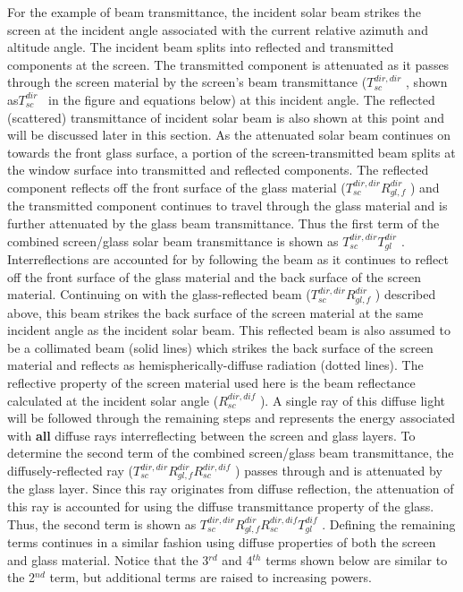 For the example of beam transmittance, the incident solar beam strikes the screen at the incident angle associated with the current relative azimuth and altitude angle. The incident beam splits into reflected and transmitted components at the screen. The transmitted component is attenuated as it passes through the screen material by the screen's beam transmittance (\(T_{sc}^{dir,dir}\) , shown as\(T_{sc}^{dir}\) ~in the figure and equations below) at this incident angle. The reflected (scattered) transmittance of incident solar beam is also shown at this point and will be discussed later in this section. As the attenuated solar beam continues on towards the front glass surface, a portion of the screen-transmitted beam splits at the window surface into transmitted and reflected components. The reflected component reflects off the front surface of the glass material (\(T_{sc}^{dir,dir}R_{gl,f}^{dir}\) ) and the transmitted component continues to travel through the glass material and is further attenuated by the glass beam transmittance. Thus the first term of the combined screen/glass solar beam transmittance is shown as \(T_{sc}^{dir,dir}T_{gl}^{dir}\) . Interreflections are accounted for by following the beam as it continues to reflect off the front surface of the glass material and the back surface of the screen material. Continuing on with the glass-reflected beam (\(T_{sc}^{dir,dir}R_{gl,f}^{dir}\) ) described above, this beam strikes the back surface of the screen material at the same incident angle as the incident solar beam. This reflected beam is also assumed to be a collimated beam (solid lines) which strikes the back surface of the screen material and reflects as hemispherically-diffuse radiation (dotted lines). The reflective property of the screen material used here is the beam reflectance calculated at the incident solar angle (\(R_{sc}^{dir,dif}\) ). A single ray of this diffuse light will be followed through the remaining steps and represents the energy associated with \textbf{all} diffuse rays interreflecting between the screen and glass layers. To determine the second term of the combined screen/glass beam transmittance, the diffusely-reflected ray (\(T_{sc}^{dir,dir}R_{gl,f}^{dir}R_{sc}^{dir,dif}\) ) passes through and is attenuated by the glass layer. Since this ray originates from diffuse reflection, the attenuation of this ray is accounted for using the diffuse transmittance property of the glass. Thus, the second term is shown as \(T_{sc}^{dir,dir}R_{gl,f}^{dir}R_{sc}^{dir,dif}T_{gl}^{dif}\) . Defining the remaining terms continues in a similar fashion using diffuse properties of both the screen and glass material. Notice that the 3\(^{rd}\) and 4\(^{th}\) terms shown below are similar to the 2\(^{nd}\) term, but additional terms are raised to increasing powers.

